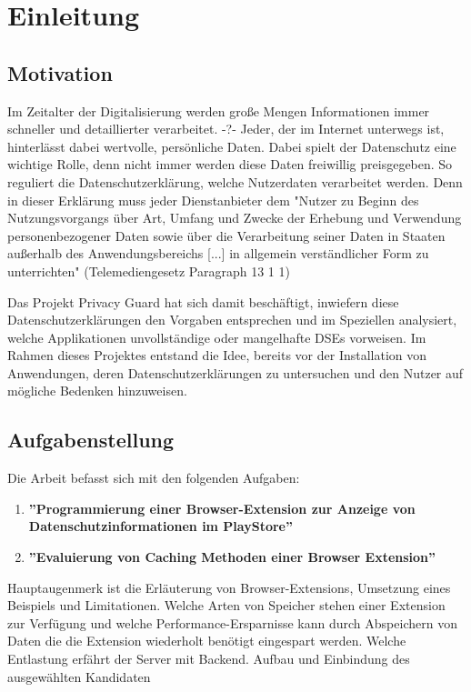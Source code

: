 \chapter{Einleitung}
\label{c:einleitung}

\section{Motivation}
\label{s:motivation}
Im Zeitalter der Digitalisierung werden große Mengen Informationen immer schneller und detaillierter verarbeitet. -?-  Jeder, der im Internet unterwegs ist, hinterlässt dabei wertvolle, persönliche Daten. Dabei spielt der Datenschutz eine wichtige Rolle, denn nicht immer werden diese Daten freiwillig preisgegeben. So reguliert die Datenschutzerklärung, welche Nutzerdaten verarbeitet werden. Denn in dieser Erklärung muss jeder Dienstanbieter dem "Nutzer zu Beginn des Nutzungsvorgangs über Art, Umfang und Zwecke der Erhebung und Verwendung personenbezogener Daten sowie über die Verarbeitung seiner Daten in Staaten außerhalb des Anwendungsbereichs [...] in allgemein verständlicher Form zu unterrichten"  (Telemediengesetz Paragraph 13 1 1)

Das Projekt Privacy Guard hat sich damit beschäftigt, inwiefern diese Datenschutzerklärungen den Vorgaben entsprechen und im Speziellen analysiert, welche Applikationen unvollständige oder mangelhafte DSEs vorweisen. Im Rahmen dieses Projektes entstand die Idee, bereits vor der Installation von Anwendungen, deren Datenschutzerklärungen zu untersuchen und den Nutzer auf mögliche Bedenken hinzuweisen.

\section{Aufgabenstellung}
\label{s:aufgabenstellung}

Die Arbeit befasst sich mit den folgenden Aufgaben:
\begin{enumerate}
	\item \textbf{''Programmierung einer Browser-Extension zur Anzeige von Datenschutzinformationen im PlayStore''}
	\item \textbf{''Evaluierung von Caching Methoden einer Browser Extension''}
\end{enumerate}

Hauptaugenmerk ist die Erläuterung von Browser-Extensions, Umsetzung eines Beispiels und Limitationen.
Welche Arten von Speicher stehen einer Extension zur Verfügung und welche Performance-Ersparnisse kann durch Abspeichern von Daten die die Extension wiederholt benötigt eingespart werden. Welche Entlastung erfährt der Server mit Backend. Aufbau und Einbindung des ausgewählten Kandidaten


